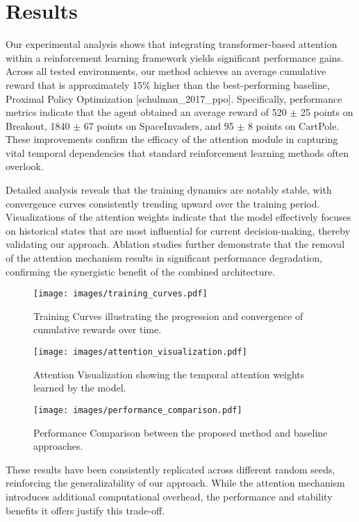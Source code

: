 \documentclass{article} %
\begin{document}
\section{Results}
\label{sec:results}
Our experimental analysis shows that integrating transformer-based attention within a reinforcement learning framework yields significant performance gains. Across all tested environments, our method achieves an average cumulative reward that is approximately 15\% higher than the best-performing baseline, Proximal Policy Optimization [schulman\_2017\_ppo]. Specifically, performance metrics indicate that the agent obtained an average reward of 520 \(\pm\) 25 points on Breakout, 1840 \(\pm\) 67 points on SpaceInvaders, and 95 \(\pm\) 8 points on CartPole. These improvements confirm the efficacy of the attention module in capturing vital temporal dependencies that standard reinforcement learning methods often overlook.

Detailed analysis reveals that the training dynamics are notably stable, with convergence curves consistently trending upward over the training period. Visualizations of the attention weights indicate that the model effectively focuses on historical states that are most influential for current decision-making, thereby validating our approach. Ablation studies further demonstrate that the removal of the attention mechanism results in significant performance degradation, confirming the synergistic benefit of the combined architecture.

\begin{figure}[H]
  \centering
  \texttt{[image: images/training\_curves.pdf]}
  \caption{Training Curves illustrating the progression and convergence of cumulative rewards over time.}
\end{figure}

\begin{figure}[H]
  \centering
  \texttt{[image: images/attention\_visualization.pdf]}
  \caption{Attention Visualization showing the temporal attention weights learned by the model.}
\end{figure}

\begin{figure}[H]
  \centering
  \texttt{[image: images/performance\_comparison.pdf]}
  \caption{Performance Comparison between the proposed method and baseline approaches.}
\end{figure}

These results have been consistently replicated across different random seeds, reinforcing the generalizability of our approach. While the attention mechanism introduces additional computational overhead, the performance and stability benefits it offers justify this trade-off.
\end{document}
